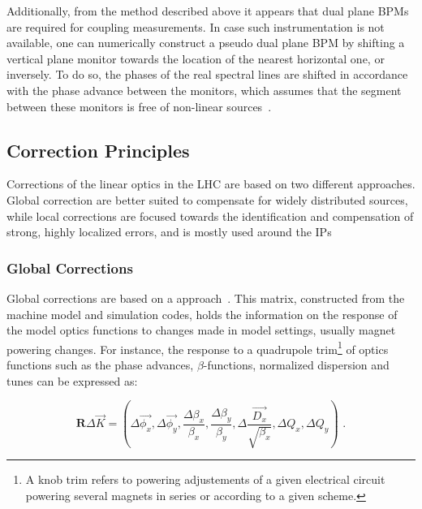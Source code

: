 Additionally, from the method described above it appears that dual plane BPMs are required for coupling measurements.
In case such instrumentation is not available, one can numerically construct a pseudo dual plane BPM by shifting a vertical plane monitor towards the location of the nearest horizontal one, or inversely.
To do so, the phases of the real spectral lines are shifted in accordance with the phase advance between the monitors, which assumes that the segment between these monitors is free of non-linear sources~\cite{PHD:Vanbavinckhove}.

\subsection{Correction Principles}

Corrections of the linear optics in the LHC are based on two different approaches.
Global correction are better suited to compensate for widely distributed sources, while local corrections are focused towards the identification and compensation of strong, highly localized errors, and is mostly used around the IPs

\subsubsection*{Global Corrections}

Global corrections are based on a  approach~\cite{PHD:Vanbavinckhove,EPAC:Tomas:Procedures_Accuracy_Estimates_Beta_Beat_Correction_LHC}.
This matrix, constructed from the machine model and simulation codes, holds the information on the response of the model optics functions to changes made in model settings, usually magnet powering changes.
For instance, the response to a quadrupole  trim\footnote{A knob trim refers to powering adjustements of a given electrical circuit powering several magnets in series or according to a given scheme.} of optics functions such as the phase advances, \(\beta\)-functions, normalized dispersion and tunes can be expressed as:

\begin{equation}
  \mathbf{R} \Delta \vec{K} = \left(\Delta \overrightarrow{\phi_x}, \Delta \overrightarrow{\phi_y}, \frac{\Delta \beta_x}{\beta_x}, \frac{\Delta \beta_y}{\beta_y}, \Delta \frac{\overrightarrow{D_x}}{\sqrt{\beta_x}}, \Delta Q_x, \Delta Q_y \right) \text{ .}
  \label{equation:response_matrix}
\end{equation}

